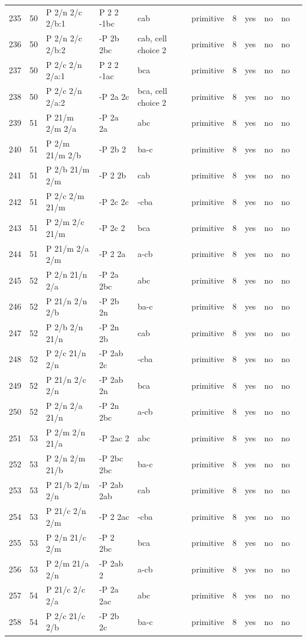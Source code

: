 \begin{center}
\begin{small}
\begin{longtable}{|l|l|l|l|l|l|l|l|l|l|l|}
235 &50 &P 2/n 2/c 2/b:1 &P 2 2 -1bc &cab &primitive &8 &yes &no &no \\ 
236 &50 &P 2/n 2/c 2/b:2 &-P 2b 2bc &cab, cell choice 2 &primitive &8 &yes &no &no \\ 
237 &50 &P 2/c 2/n 2/a:1 &P 2 2 -1ac &bca &primitive &8 &yes &no &no \\ 
238 &50 &P 2/c 2/n 2/a:2 &-P 2a 2c &bca, cell choice 2 &primitive &8 &yes &no &no \\ 
239 &51 &P 21/m 2/m 2/a &-P 2a 2a &abc &primitive &8 &yes &no &no \\ 
240 &51 &P 2/m 21/m 2/b &-P 2b 2 &ba-c &primitive &8 &yes &no &no \\ 
241 &51 &P 2/b 21/m 2/m &-P 2 2b &cab &primitive &8 &yes &no &no \\ 
242 &51 &P 2/c 2/m 21/m &-P 2c 2c &-cba &primitive &8 &yes &no &no \\ 
243 &51 &P 2/m 2/c 21/m &-P 2c 2 &bca &primitive &8 &yes &no &no \\ 
244 &51 &P 21/m 2/a 2/m &-P 2 2a &a-cb &primitive &8 &yes &no &no \\ 
245 &52 &P 2/n 21/n 2/a &-P 2a 2bc &abc &primitive &8 &yes &no &no \\ 
246 &52 &P 21/n 2/n 2/b &-P 2b 2n &ba-c &primitive &8 &yes &no &no \\ 
247 &52 &P 2/b 2/n 21/n &-P 2n 2b &cab &primitive &8 &yes &no &no \\ 
248 &52 &P 2/c 21/n 2/n &-P 2ab 2c &-cba &primitive &8 &yes &no &no \\ 
249 &52 &P 21/n 2/c 2/n &-P 2ab 2n &bca &primitive &8 &yes &no &no \\ 
250 &52 &P 2/n 2/a 21/n &-P 2n 2bc &a-cb &primitive &8 &yes &no &no \\ 
251 &53 &P 2/m 2/n 21/a &-P 2ac 2 &abc &primitive &8 &yes &no &no \\ 
252 &53 &P 2/n 2/m 21/b &-P 2bc 2bc &ba-c &primitive &8 &yes &no &no \\ 
253 &53 &P 21/b 2/m 2/n &-P 2ab 2ab &cab &primitive &8 &yes &no &no \\ 
254 &53 &P 21/c 2/n 2/m &-P 2 2ac &-cba &primitive &8 &yes &no &no \\ 
255 &53 &P 2/n 21/c 2/m &-P 2 2bc &bca &primitive &8 &yes &no &no \\ 
256 &53 &P 2/m 21/a 2/n &-P 2ab 2 &a-cb &primitive &8 &yes &no &no \\ 
257 &54 &P 21/c 2/c 2/a &-P 2a 2ac &abc &primitive &8 &yes &no &no \\ 
258 &54 &P 2/c 21/c 2/b &-P 2b 2c &ba-c &primitive &8 &yes &no &no \\ 

\end{longtable}
\end{small}
\end{center}
